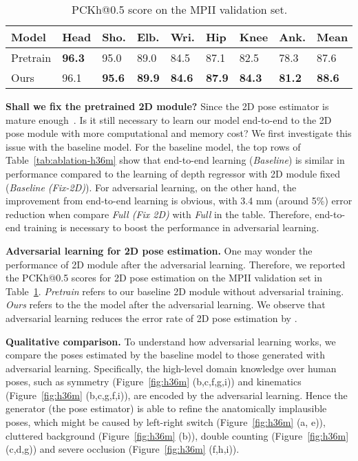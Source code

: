 \documentclass[10pt,twocolumn,letterpaper]{article}
\newcommand{\smalltitle}[1]{\vspace{0.2em}\noindent \textbf{{#1}}}
\begin{document}
\begin{table}\begin{footnotesize}
	\centering
	\begin{tabular} 
		{@{}p{1cm}|p{0.4cm}p{0.4cm}p{0.4cm}p{0.4cm}p{0.4cm}p{0.4cm}p{0.5cm}|p{0.5cm}}
		\hline
		Model & Head & Sho. & Elb. & Wri. & Hip & Knee & Ank. & Mean\\
		\hline
		Pretrain & \textbf{96.3} & 95.0   &  89.0 &  84.5 &   87.1 &  82.5 &  78.3 &   87.6  \\
		Ours & 96.1 & \textbf{95.6}  &   \textbf{89.9} & \textbf{84.6} &  \textbf{87.9} &  \textbf{84.3} & \textbf{81.2}  & \textbf{88.6} \\
		\hline
	\end{tabular}
\end{footnotesize}
\caption{PCKh@0.5 score on the MPII validation set. }
\vspace{-1em}
\label{tab:MPII}
\end{table}


\smalltitle{Shall we fix the pretrained 2D module?} 
Since the 2D pose estimator is mature enough~\cite{newell2016stacked,wei2016convolutional,cao2016realtime}. 
Is it still necessary to learn our model end-to-end to the 2D pose module with more computational and memory cost? 
We first investigate this issue with the baseline model.  
For the baseline model, the top rows of Table~\ref{tab:ablation-h36m} show that end-to-end learning (\textit{Baseline}) is similar in performance compared to the learning of depth regressor with 2D module fixed (\textit{Baseline (Fix-2D)}). 
For adversarial learning, on the other hand, the improvement from end-to-end learning is obvious, with 3.4 mm (around 5\%) error reduction when compare \textit{Full (Fix 2D)} with \textit{Full} in the table.
Therefore, end-to-end training is necessary to boost the performance in adversarial learning.

\smalltitle{Adversarial learning for 2D pose estimation. }
One may wonder the performance of 2D module after the adversarial learning. 
Therefore, we reported the PCKh@0.5 scores for 2D pose estimation on the MPII validation set in Table~\ref{tab:MPII}.  
\textit{Pretrain} refers to our baseline 2D module without adversarial training. 
\textit{Ours} refers to the the model after the adversarial learning.  
We observe that adversarial learning reduces the error rate of 2D pose estimation by . 

\smalltitle{Qualitative comparison. } 
To understand how adversarial learning works, we compare the poses estimated by the baseline model to those generated with adversarial learning. 
Specifically, the high-level domain knowledge over human poses, such as symmetry (Figure~\ref{fig:h36m} (b,c,f,g,i)) and kinematics (Figure~\ref{fig:h36m} (b,c,g,f,i)), are encoded by the adversarial learning.
Hence the generator (\ie the pose estimator) is able to refine the anatomically implausible poses, which might be caused by left-right switch (Figure~\ref{fig:h36m} (a, e)), cluttered background (Figure~\ref{fig:h36m} (b)), double counting (Figure~\ref{fig:h36m} (c,d,g)) and severe occlusion (Figure~\ref{fig:h36m} (f,h,i)). 
\end{document}
